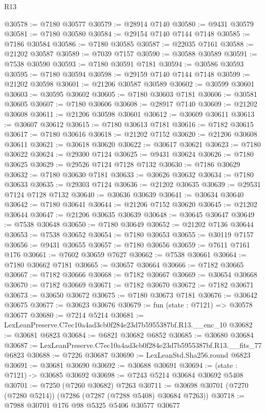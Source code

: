 \begin{lexlean}{R13}
\begin{coremodule}
@30578 := @7180 @30577
@30579 := @28914 @7140
@30580 := @9431 @30579
@30581 := @7180 @30580
@30584 := @29154 @7140 @7144 @7148
@30585 := @7186 @30584
@30586 := @7180 @30585
@30587 := @22035 @7161
@30588 := @21202 @30587
@30589 := @7039 @7157
@30590 := @30588 @30589
@30591 := @7538 @30590
@30593 := @7180 @30591 @7181
@30594 := @30586 @30593
@30595 := @7180 @30594
@30598 := @29159 @7140 @7144 @7148
@30599 := @21202 @30598
@30601 := @21206 @30587 @30589
@30602 := @30599 @30601
@30603 := @30595 @30602
@30605 := @7180 @30603 @7181
@30606 := @30581 @30605
@30607 := @7180 @30606
@30608 := @28917 @7140
@30609 := @21202 @30608
@30611 := @21206 @30598 @30601
@30612 := @30609 @30611
@30613 := @30607 @30612
@30615 := @7180 @30613 @7181
@30616 := @7182 @30615
@30617 := @7180 @30616
@30618 := @21202 @7152
@30620 := @21206 @30608 @30611
@30621 := @30618 @30620
@30622 := @30617 @30621
@30623 := @7180 @30622
@30624 := @29300 @7124
@30625 := @9431 @30624
@30626 := @7180 @30625
@30629 := @29526 @7124 @7128 @7132
@30630 := @7186 @30629
@30632 := @7180 @30630 @7181
@30633 := @30626 @30632
@30634 := @7180 @30633
@30635 := @29303 @7124
@30636 := @21202 @30635
@30639 := @29531 @7124 @7128 @7132
@30640 := @30636 @30639
@30641 := @30634 @30640
@30642 := @7180 @30641
@30644 := @21206 @7152 @30620
@30645 := @21202 @30644
@30647 := @21206 @30635 @30639
@30648 := @30645 @30647
@30649 := @7538 @30648
@30650 := @7180 @30649
@30652 := @21202 @7136 @30644
@30653 := @7538 @30652
@30654 := @7180 @30653
@30655 := @30119 @7157
@30656 := @9431 @30655
@30657 := @7180 @30656
@30659 := @7611 @7161 @176
@30661 := @7602 @30659 @7627
@30662 := @7538 @30661
@30664 := @7180 @30662 @7181
@30665 := @30657 @30664
@30666 := @7182 @30665
@30667 := @7182 @30666
@30668 := @7182 @30667
@30669 := @30654 @30668
@30670 := @7182 @30669
@30671 := @7182 @30670
@30672 := @7182 @30671
@30673 := @30650 @30672
@30675 := @7180 @30673 @7181
@30676 := @30642 @30675
@30677 := @30623 @30676
@30679 := fun (state : @7121) => @30578 @30677
@30680 := @7214 @5214
@30681 := LexLeanPreserve.C7ec10a4ad3cb0f284e23d7b5955387bf.R13.__enc_10
@30682 := @30681 @6823
@30684 := @6821 @30682 @6852
@30685 := @30680 @30684
@30687 := LexLeanPreserve.C7ec10a4ad3cb0f284e23d7b5955387bf.R13.__fits_77 @6823
@30688 := @7226 @30687
@30690 := LexLeanStd.Sha256.round @6823
@30691 := @30681 @30690
@30692 := @30688 @30691
@30694 := (state : @7121) -> @30685 @30692
@30698 := @7243 @5214 @30684 @30692 @5408
@30701 := @7250 (@7260 @30682) @7263
@30711 := @30698 @30701 (@7270 (@7280 @5214)) (@7286 (@7287 (@7288 @5408) @30684 @7263))
@30718 := @7988 @30701 @176 @98 @5325 @5406 @30577 @30677

\end{coremodule}
\end{lexlean}
